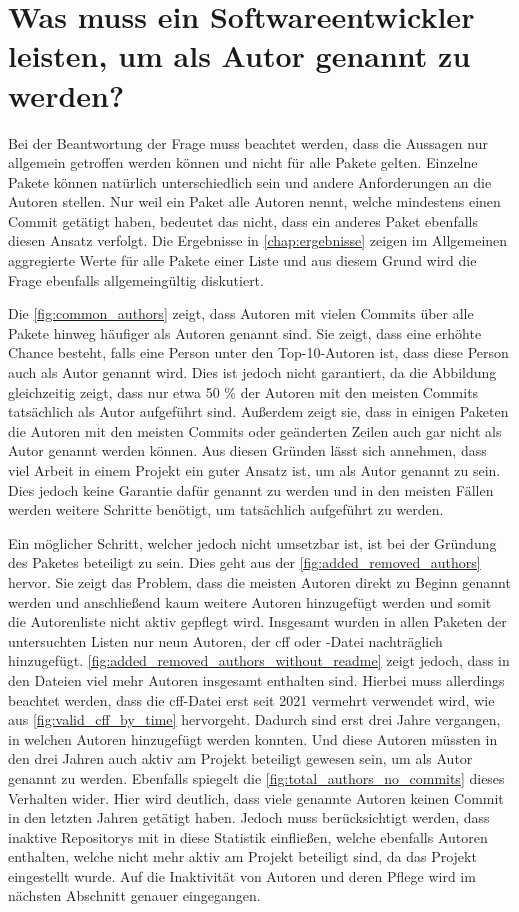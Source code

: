 \section{Was muss ein Softwareentwickler leisten, um als Autor genannt zu werden?}
\label{sec:zitationsfaehiger_autor_diskussion}
Bei der Beantwortung der Frage muss beachtet werden, dass die Aussagen nur allgemein getroffen werden können und nicht für alle Pakete gelten.
Einzelne Pakete können natürlich unterschiedlich sein und andere Anforderungen an die Autoren stellen.
Nur weil ein Paket alle Autoren nennt, welche mindestens einen Commit getätigt haben, bedeutet das nicht, dass ein anderes Paket ebenfalls diesen Ansatz verfolgt.
Die Ergebnisse in \autoref{chap:ergebnisse} zeigen im Allgemeinen aggregierte Werte für alle Pakete einer Liste und aus diesem Grund wird die Frage ebenfalls allgemeingültig diskutiert.

Die \autoref{fig:common_authors} zeigt, dass Autoren mit vielen Commits über alle Pakete hinweg häufiger als Autoren genannt sind.
Sie zeigt, dass eine erhöhte Chance besteht, falls eine Person unter den Top-10-Autoren ist, dass diese Person auch als Autor genannt wird.
Dies ist jedoch nicht garantiert, da die Abbildung gleichzeitig zeigt, dass nur etwa 50 \% der Autoren mit den meisten Commits tatsächlich als Autor aufgeführt sind.
Außerdem zeigt sie, dass in einigen Paketen die Autoren mit den meisten Commits oder geänderten Zeilen auch gar nicht als Autor genannt werden können.
Aus diesen Gründen lässt sich annehmen, dass viel Arbeit in einem Projekt ein guter Ansatz ist, um als Autor genannt zu sein.
Dies jedoch keine Garantie dafür genannt zu werden und in den meisten Fällen werden weitere Schritte benötigt, um tatsächlich aufgeführt zu werden.

Ein möglicher Schritt, welcher jedoch nicht umsetzbar ist, ist bei der Gründung des Paketes beteiligt zu sein.
Dies geht aus der \autoref{fig:added_removed_authors} hervor.
Sie zeigt das Problem, dass die meisten Autoren direkt zu Beginn genannt werden und anschließend kaum weitere Autoren hinzugefügt werden und somit die Autorenliste nicht aktiv gepflegt wird.
Insgesamt wurden in allen Paketen der untersuchten Listen nur neun Autoren, der \gls{cff} oder -Datei nachträglich hinzugefügt.
\autoref{fig:added_removed_authors_without_readme} zeigt jedoch, dass in den Dateien viel mehr Autoren insgesamt enthalten sind.
Hierbei muss allerdings beachtet werden, dass die \gls{cff}-Datei erst seit 2021 vermehrt verwendet wird, wie aus \autoref{fig:valid_cff_by_time} hervorgeht.
Dadurch sind erst drei Jahre vergangen, in welchen Autoren hinzugefügt werden konnten.
Und diese Autoren müssten in den drei Jahren auch aktiv am Projekt beteiligt gewesen sein, um als Autor genannt zu werden.
Ebenfalls spiegelt die \autoref{fig:total_authors_no_commits} dieses Verhalten wider.
Hier wird deutlich, dass viele genannte Autoren keinen Commit in den letzten Jahren getätigt haben.
Jedoch muss berücksichtigt werden, dass inaktive Repositorys mit in diese Statistik einfließen, welche ebenfalls Autoren enthalten, welche nicht mehr aktiv am Projekt beteiligt sind, da das Projekt eingestellt wurde.
Auf die Inaktivität von Autoren und deren Pflege wird im nächsten Abschnitt genauer eingegangen.

